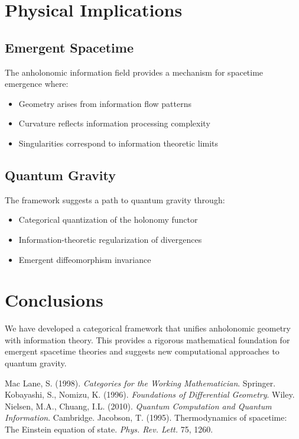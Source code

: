 \documentclass[11pt]{article}
\theoremstyle{definition}
\begin{document}
\section{Physical Implications}

\subsection{Emergent Spacetime}
The anholonomic information field provides a mechanism for spacetime emergence where:
\begin{itemize}
\item Geometry arises from information flow patterns
\item Curvature reflects information processing complexity
\item Singularities correspond to information theoretic limits
\end{itemize}

\subsection{Quantum Gravity}
The framework suggests a path to quantum gravity through:
\begin{itemize}
\item Categorical quantization of the holonomy functor
\item Information-theoretic regularization of divergences
\item Emergent diffeomorphism invariance
\end{itemize}

\section{Conclusions}

We have developed a categorical framework that unifies anholonomic geometry with information theory. This provides a rigorous mathematical foundation for emergent spacetime theories and suggests new computational approaches to quantum gravity.

\begin{thebibliography}{99}
 Mac Lane, S. (1998). \emph{Categories for the Working Mathematician}. Springer.
 Kobayashi, S., Nomizu, K. (1996). \emph{Foundations of Differential Geometry}. Wiley.
 Nielsen, M.A., Chuang, I.L. (2010). \emph{Quantum Computation and Quantum Information}. Cambridge.
 Jacobson, T. (1995). Thermodynamics of spacetime: The Einstein equation of state. \emph{Phys. Rev. Lett.} 75, 1260.
\end{thebibliography}
\end{document}

